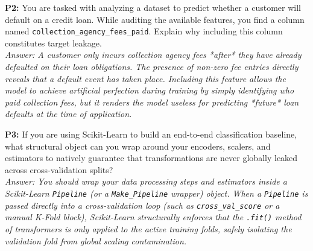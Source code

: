\documentclass{article}
\begin{document}
\newline
\textbf{P2:} You are tasked with analyzing a dataset to predict whether a customer will default on a credit loan. While auditing the available features, you find a column named \texttt{collection\_agency\_fees\_paid}. Explain why including this column constitutes target leakage.
\\
\textit{Answer: A customer only incurs collection agency fees *after* they have already defaulted on their loan obligations. The presence of non-zero fee entries directly reveals that a default event has taken place. Including this feature allows the model to achieve artificial perfection during training by simply identifying who paid collection fees, but it renders the model useless for predicting *future* loan defaults at the time of application.}

\newline
\textbf{P3:} If you are using Scikit-Learn to build an end-to-end classification baseline, what structural object can you wrap around your encoders, scalers, and estimators to natively guarantee that transformations are never globally leaked across cross-validation splits?
\\
\textit{Answer: You should wrap your data processing steps and estimators inside a Scikit-Learn \texttt{Pipeline} (or a \texttt{Make\_Pipeline} wrapper) object. When a \texttt{Pipeline} is passed directly into a cross-validation loop (such as \texttt{cross\_val\_score} or a manual K-Fold block), Scikit-Learn structurally enforces that the \texttt{.fit()} method of transformers is only applied to the active training folds, safely isolating the validation fold from global scaling contamination.}
\end{document}
